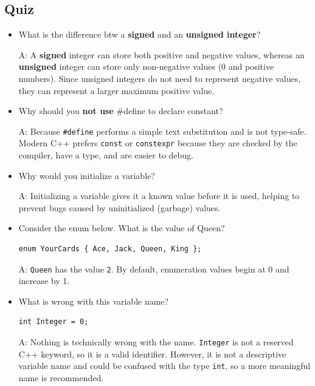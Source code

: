 \documentclass[10pt]{article}
\begin{document}
\subsection{Quiz}
\begin{itemize}
    \item What is the difference btw a \textbf{signed} and an \textbf{unsigned integer}?

    A:
    A \textbf{signed} integer can store both positive and negative values, whereas an \textbf{unsigned} integer can store only non-negative values (0 and positive numbers). Since unsigned integers do not need to represent negative values, they can represent a larger maximum positive value.\\

    \item Why should you \textbf{not use} \#define to declare constant?

    A:
    Because \verb|#define| performs a simple text substitution and is not type-safe. Modern C++ prefers \verb|const| or \verb|constexpr| because they are checked by the compiler, have a type, and are easier to debug.\\

    \item Why would you initialize a variable?

    A:
    Initializing a variable gives it a known value before it is used, helping to prevent bugs caused by uninitialized (garbage) values.

    \item Consider the enum below. What is the value of Queen?\\

\begin{verbatim}
enum YourCards { Ace, Jack, Queen, King };
\end{verbatim}

    A:
    \verb|Queen| has the value \verb|2|. By default, enumeration values begin at 0 and increase by 1.

    \item What is wrong with this variable name?\\

\begin{verbatim}
int Integer = 0;
\end{verbatim}

    A:
    Nothing is technically wrong with the name. \verb|Integer| is not a reserved C++ keyword, so it is a valid identifier. However, it is not a descriptive variable name and could be confused with the type \verb|int|, so a more meaningful name is recommended.\\

\end{itemize}
\end{document}
